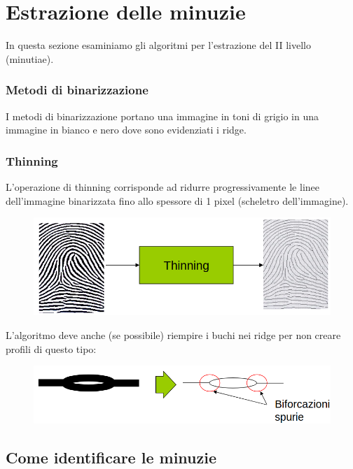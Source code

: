\newpage
\section{Estrazione delle minuzie}

In questa sezione esaminiamo gli algoritmi per l'estrazione del II livello (minutiae).

\subsubsection{Metodi di binarizzazione}

I metodi di binarizzazione portano una immagine in toni di
grigio in una immagine in bianco e nero dove sono
evidenziati i ridge.

\subsubsection{Thinning}

L’operazione di thinning corrisponde ad ridurre
progressivamente le linee dell’immagine
binarizzata fino allo spessore di 1 pixel (scheletro
dell’immagine).

\begin{figure}[ht]
    \centering
    \includegraphics[width=0.75\linewidth]{chapters/images-chap6/thinning.png}
\end{figure}

L’algoritmo deve anche (se possibile) riempire i
buchi nei ridge per non creare profili di questo
tipo:
\begin{figure}[ht]
    \centering
    \includegraphics[width=1\linewidth]{chapters/images-chap6/thinning-bif.png}
\end{figure}

\newpage
\subsection{Come identificare le minuzie}

